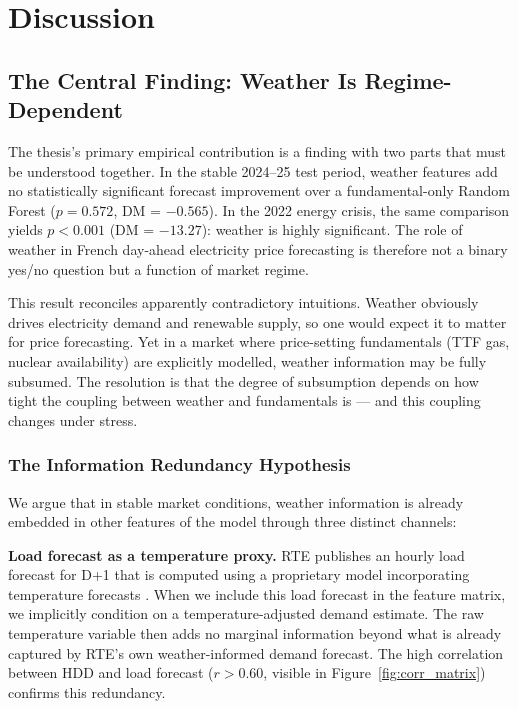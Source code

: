 \chapter{Discussion}
\label{chap:discussion}

\section{The Central Finding: Weather Is Regime-Dependent}

The thesis's primary empirical contribution is a finding with two parts that
must be understood together. In the stable 2024--25 test period, weather
features add no statistically significant forecast improvement over a
fundamental-only Random Forest ($p = 0.572$, DM = $-0.565$). In the 2022
energy crisis, the same comparison yields $p < 0.001$ (DM = $-13.27$):
weather is highly significant. The role of weather in French day-ahead
electricity price forecasting is therefore not a binary yes/no question but a
function of market regime.

This result reconciles apparently contradictory intuitions. Weather obviously
drives electricity demand and renewable supply, so one would expect it to
matter for price forecasting. Yet in a market where price-setting fundamentals
(TTF gas, nuclear availability) are explicitly modelled, weather information
may be fully subsumed. The resolution is that the degree of subsumption depends
on how tight the coupling between weather and fundamentals is — and this
coupling changes under stress.

\subsection{The Information Redundancy Hypothesis}

We argue that in stable market conditions, weather information is already
embedded in other features of the model through three distinct channels:

\textbf{Load forecast as a temperature proxy.} RTE publishes an hourly load
forecast for D+1 that is computed using a proprietary model incorporating
temperature forecasts \citep{rte2023}. When we include this load forecast in
the feature matrix, we implicitly condition on a temperature-adjusted demand
estimate. The raw temperature variable then adds no marginal information beyond
what is already captured by RTE's own weather-informed demand forecast. The
high correlation between HDD and load forecast ($r > 0.60$, visible in
Figure~\ref{fig:corr_matrix}) confirms this redundancy.

